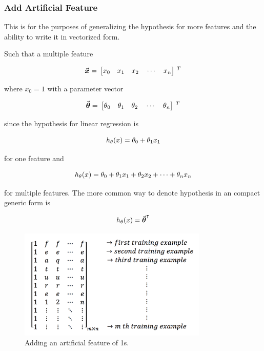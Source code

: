 \subsubsection{Add Artificial Feature}

This is for the purposes of generalizing the hypothesis for more features 
and the ability to write it in vectorized form. 

Such that a multiple feature 

\begin{equation}{\label{eqn:featureVector}}
\vec{\bm{x}}
=\,
\begin{bmatrix}
x_0\quad x_1 \quad  x_2 \quad \cdots \quad x_n 
\end{bmatrix}
\,^T
\end{equation} 

where $x_0 = 1$ with a parameter vector 

\begin{equation}{\label{eqn:parameterVector}}
\vec{\bm{\theta}}
=\,
\begin{bmatrix}
\theta_0\quad \theta_1 \quad  \theta_2 \quad \cdots \quad \theta_n 
\end{bmatrix}
\,^T
\end{equation} 

since the hypothesis for linear regression is 

\begin{equation}{\label{eqn:costFuncOneFeature}}
h_{\theta}(x) = \theta_0 + \theta_1 x_1
\end{equation} 

for one feature and 

\begin{equation}{\label{eqn:costFuncMltplFeature}}
h_{\theta}(x) = \theta_0 + \theta_1 x_1 + \theta_2 x_2 + \cdots+ \theta_n x_n
\end{equation}

for multiple features. The more common way to denote hypothesis in 
an compact generic form is 

\begin{equation}{\label{eqn:costFuncMltplFeature}}
h_{\theta}(x) = {\vec{\bm{\theta}}}^\intercal
\end{equation}

\begin{figure}
\begin{center}
\includegraphics[width=9cm]{figures/addArtificialFeature}    %
\caption{Adding an artificial feature of 1s.} 
\label{fig:addArtificialFeature}
\end{center}
\end{figure}

